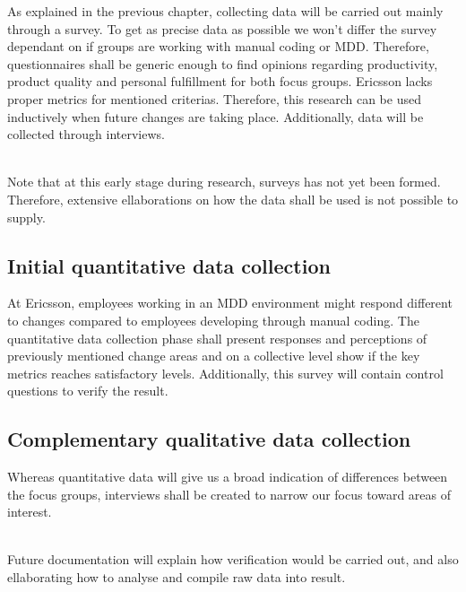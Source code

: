 \documentclass[ProjectPlan_innit.tex]{subfiles}
\begin{document}
As explained in the previous chapter, collecting data will be carried out mainly through a survey. To get as precise data as possible we won't differ the survey dependant on if groups are working with manual coding or MDD. Therefore, questionnaires shall be generic enough to find opinions regarding productivity, product quality and personal fulfillment for both focus groups. Ericsson lacks proper metrics for mentioned criterias. Therefore, this research can be used inductively when future changes are taking place. Additionally, data will be collected through interviews.

\hspace{0pt}\\ Note that at this early stage during research, surveys has not yet been formed. Therefore, extensive ellaborations on how the data shall be used is not possible to supply. 

\subsection{Initial quantitative data collection}
At Ericsson, employees working in an MDD environment might respond different to changes compared to employees developing through manual coding. The quantitative data collection phase shall present responses and perceptions of previously mentioned change areas and on a collective level show if the key metrics reaches satisfactory levels. Additionally, this survey will contain control questions to verify the result.

\subsection{Complementary qualitative data collection}


Whereas quantitative data will give us a broad indication of differences between the focus groups, interviews shall be created to narrow our focus toward areas of interest. 

\hspace{0pt}\\ Future documentation will explain how verification would be carried out, and also ellaborating how to analyse and compile raw data into result.
\end{document}
